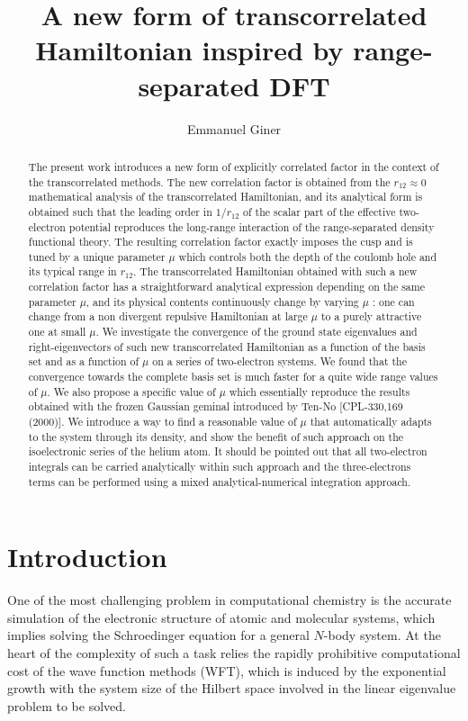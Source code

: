 \documentclass[aip,jcp,reprint,noshowkeys,superscriptaddress,twocolumn]{revtex4-1}
\begin{document}
	

\title{A new form of transcorrelated Hamiltonian inspired by range-separated DFT}

\author{Emmanuel Giner}

\begin{abstract}
The present work introduces a new form of explicitly correlated factor in the context of the transcorrelated methods. 
The new correlation factor is obtained from the $r_{12} \approx 0$ mathematical analysis of the transcorrelated Hamiltonian, and its analytical form is obtained such that the leading order in $1/r_{12}$ of the scalar part of the effective two-electron potential reproduces the long-range interaction of the range-separated density functional theory. 
The resulting correlation factor exactly imposes the cusp and is tuned by a unique parameter $\mu$ which controls both the depth of the coulomb hole and its typical range in $r_{12}$. 
The transcorrelated Hamiltonian obtained with such a new correlation factor has a straightforward analytical expression  depending on the same parameter $\mu$, and its physical contents continuously change by varying $\mu$ : one can change from a non divergent repulsive Hamiltonian at large $\mu$ to a purely attractive one at small $\mu$. 
We investigate the convergence of the ground state eigenvalues and right-eigenvectors of such new transcorrelated Hamiltonian as a function of the basis set and as a function of $\mu$ on a series of two-electron systems. 
We found that the convergence towards the complete basis set is much faster for a quite wide range values of $\mu$. 
We also propose a specific value of $\mu$ which essentially reproduce the results obtained with the frozen Gaussian geminal introduced by Ten-No [CPL-330,169 (2000)]. 
We introduce a way to find a reasonable value of $\mu$ that automatically adapts to the system through its density, and show the benefit of such approach on the isoelectronic series of the helium atom.  
It should be pointed out that all two-electron integrals can be carried analytically within such approach and the three-electrons terms can be performed using a mixed analytical-numerical integration approach.

\end{abstract}

\maketitle
\section{Introduction}
One of the most challenging problem in computational chemistry is the accurate simulation of the electronic structure of atomic and molecular systems, which implies solving the Schroedinger equation for a general $N$-body system. 
At the heart of the complexity of such a task relies the rapidly prohibitive computational cost of the wave function methods (WFT), which is induced by the exponential growth with the system size of the Hilbert space involved in the linear eigenvalue problem to be solved. 
\end{document}
